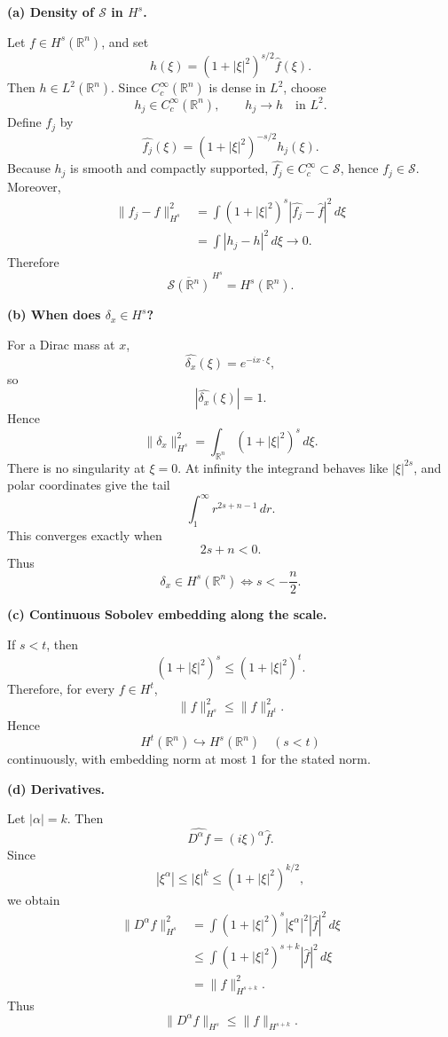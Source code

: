 \begin{solution}

\smallskip
\noindent\textbf{(a) Density of \(\mathcal S\) in \(H^s\).}

Let \(f\in H^s(\mathbb R^n)\), and set
\[
h(\xi)
=
(1+|\xi|^2)^{s/2}\widehat f(\xi).
\]
Then \(h\in L^2(\mathbb R^n)\). Since
\(C_c^\infty(\mathbb R^n)\) is dense in \(L^2\), choose
\[
h_j\in C_c^\infty(\mathbb R^n),
\qquad
h_j\to h
\quad\text{in }L^2.
\]
Define \(f_j\) by
\[
\widehat{f_j}(\xi)
=
(1+|\xi|^2)^{-s/2}h_j(\xi).
\]
Because \(h_j\) is smooth and compactly supported,
\(\widehat{f_j}\in C_c^\infty\subset\mathcal S\), hence
\(f_j\in\mathcal S\). Moreover,
\[
\begin{aligned}
\|f_j-f\|_{H^s}^2
&=
\int
(1+|\xi|^2)^s
|\widehat{f_j}-\widehat f|^2\,d\xi\\
&=
\int
|h_j-h|^2\,d\xi
\longrightarrow0.
\end{aligned}
\]
Therefore
\[
\boxed{
\overline{\mathcal S(\mathbb R^n)}^{\,H^s}
=
H^s(\mathbb R^n).}
\]

\smallskip
\noindent\textbf{(b) When does \(\delta_x\in H^s\)?}

For a Dirac mass at \(x\),
\[
\widehat{\delta_x}(\xi)
=
e^{-ix\cdot\xi},
\]
so
\[
|\widehat{\delta_x}(\xi)|=1.
\]
Hence
\[
\|\delta_x\|_{H^s}^2
=
\int_{\mathbb R^n}
(1+|\xi|^2)^s\,d\xi.
\]
There is no singularity at \(\xi=0\). At infinity the integrand behaves
like \(|\xi|^{2s}\), and polar coordinates give the tail
\[
\int_1^\infty r^{2s+n-1}\,dr.
\]
This converges exactly when
\[
2s+n<0.
\]
Thus
\[
\boxed{
\delta_x\in H^s(\mathbb R^n)
\iff
s<-\frac n2.}
\]

\smallskip
\noindent\textbf{(c) Continuous Sobolev embedding along the scale.}

If \(s<t\), then
\[
(1+|\xi|^2)^s
\le
(1+|\xi|^2)^t.
\]
Therefore, for every \(f\in H^t\),
\[
\|f\|_{H^s}^2
\le
\|f\|_{H^t}^2.
\]
Hence
\[
\boxed{
H^t(\mathbb R^n)
\hookrightarrow
H^s(\mathbb R^n)
\quad(s<t)}
\]
continuously, with embedding norm at most \(1\) for the stated norm.

\smallskip
\noindent\textbf{(d) Derivatives.}

Let \(|\alpha|=k\). Then
\[
\widehat{D^\alpha f}
=
(i\xi)^\alpha\widehat f.
\]
Since
\[
|\xi^\alpha|
\le
|\xi|^k
\le
(1+|\xi|^2)^{k/2},
\]
we obtain
\[
\begin{aligned}
\|D^\alpha f\|_{H^s}^2
&=
\int
(1+|\xi|^2)^s
|\xi^\alpha|^2
|\widehat f|^2\,d\xi\\
&\le
\int
(1+|\xi|^2)^{s+k}
|\widehat f|^2\,d\xi\\
&=
\|f\|_{H^{s+k}}^2.
\end{aligned}
\]
Thus
\[
\boxed{
\|D^\alpha f\|_{H^s}
\le
\|f\|_{H^{s+k}}.}
\]


\end{solution}

